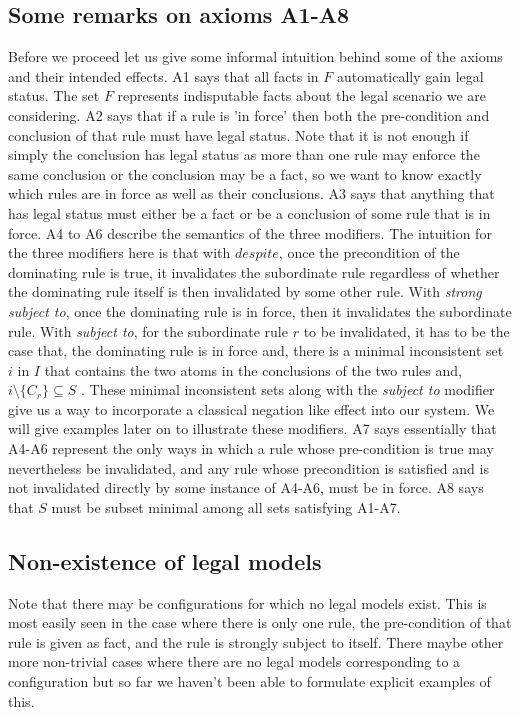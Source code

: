 \subsection{Some remarks on axioms A1-A8}
Before we proceed let us give some informal intuition behind some of the axioms and their intended effects. A1 says that all facts in $F$ automatically gain legal status. The set $F$ represents indisputable facts about the legal scenario we are considering. A2 says that if a rule is 'in force' then both the pre-condition and conclusion of that rule must have legal status. Note that it is not enough if simply the conclusion has legal status as more than one rule may enforce the same conclusion or the conclusion may be a fact, so we want to know exactly which rules are in force as well as their conclusions. A3 says that anything that has legal status must either be a fact or be a conclusion of some rule that is in force. A4 to A6 describe the semantics of the three modifiers. The intuition for the three modifiers here is that with $despite$, once the precondition of the dominating rule is true, it invalidates the subordinate rule regardless of whether the dominating rule itself is then invalidated by some other rule. With \textit{strong subject to}, once the dominating rule is in force, then it invalidates the subordinate rule. With \textit{subject to}, for the subordinate rule $r$ to be invalidated, it has to be the case that, the dominating rule is in force and, there is a minimal inconsistent set $i$ in $I$ that contains the two atoms in the conclusions of the two rules and, $i\setminus\{C_{r}\}\subseteq S$ . These minimal inconsistent sets along with the \textit{subject to} modifier give us a way to incorporate a classical negation like effect into our system. We will give examples later on to illustrate these modifiers. A7 says essentially that A4-A6 represent the only ways in which a rule whose pre-condition is true may nevertheless be invalidated, and any rule whose precondition is satisfied and is not invalidated directly by some instance of A4-A6, must be in force. A8 says that $S$ must be subset minimal among all sets satisfying A1-A7. 
\subsection{Non-existence of legal models}
Note that there may be configurations for which no legal models exist. This is most easily seen in the case where there is only one rule, the pre-condition of that rule is given as fact, and the rule is strongly subject to itself. There maybe other more non-trivial cases where there are no legal models corresponding to a configuration but so far we haven't been able to formulate explicit examples of this. 
